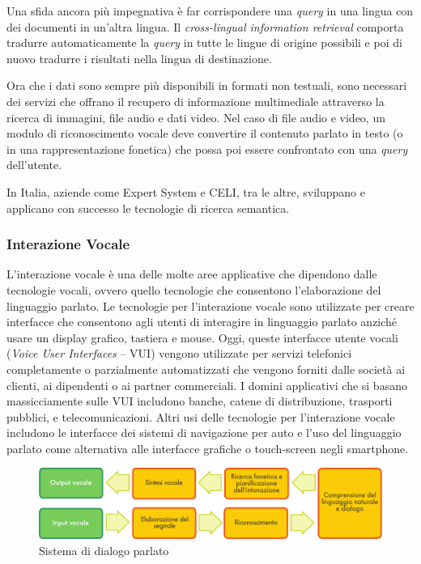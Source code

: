 \begin{multicols}{2}

Una sfida ancora pi\`{u} impegnativa \`{e} far corrispondere una \emph{query}
in una lingua con dei documenti in un'altra lingua. Il \emph{cross-lingual
  information retrieval} comporta tradurre automaticamente la \emph{query} in
tutte le lingue di origine possibili e poi di nuovo tradurre i risultati nella
lingua di destinazione.

Ora che i dati sono sempre pi\`{u} disponibili in formati non testuali, sono
necessari dei servizi che offrano il recupero di informazione multimediale
attraverso la ricerca di immagini, file audio e dati video. Nel caso di file
audio e video, un modulo di riconoscimento vocale deve convertire il contenuto
parlato in testo (o in una rappresentazione fonetica) che possa poi essere
confrontato con una \emph{query} dell'utente.

In Italia, aziende come Expert System e CELI, tra le altre, sviluppano e
applicano con successo le tecnologie di ricerca semantica.


\subsubsection{Interazione Vocale}

L'interazione vocale \`{e} una delle molte aree applicative che dipendono
dalle tecnologie vocali, ovvero quello tecnologie che consentono
l'elaborazione del linguaggio parlato. Le tecnologie per l'interazione vocale
sono utilizzate per creare interfacce che consentono agli utenti di interagire
in linguaggio parlato anzich\'{e} usare un display grafico, tastiera e
mouse. Oggi, queste interfacce utente vocali (\emph{Voice User Interfaces} --
VUI) vengono utilizzate per servizi telefonici completamente o parzialmente
automatizzati che vengono forniti dalle societ\`{a} ai clienti, ai dipendenti
o ai partner commerciali. I domini applicativi che si basano massicciamente
sulle VUI includono banche, catene di distribuzione, trasporti pubblici, e
telecomunicazioni. Altri usi delle tecnologie per l'interazione vocale
includono le interfacce dei sistemi di navigazione per auto e l'uso del
linguaggio parlato come alternativa alle interfacce grafiche o touch-screen
negli smartphone.

\begin{figure}[htb]
  \center 
  \includegraphics[width=\textwidth]{../_media/italian/simple_speech-based_dialogue_architecture}
  \caption{Sistema di dialogo parlato}
  \label{fig:dialoguearch_de}
\end{figure}


\end{multicols}
